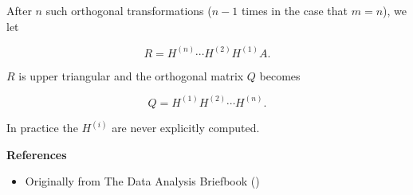 \documentclass[12pt]{article}
\begin{document}
After $n$ such orthogonal transformations ($n-1$ times in the case that $m=n$),    we let

$$ R = H^{(n)}\cdots H^{(2)}H^{(1)}A.$$

$R$ is upper triangular and the orthogonal matrix $Q$ becomes

$$ Q = H^{(1)}H^{(2)} \cdots H^{(n)}.$$

In practice the $H^{(i)}$ are never explicitly computed.

{\bf References}

\begin{itemize}
\item Originally from The Data Analysis Briefbook
()
\end{itemize}
\end{document}
